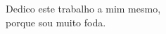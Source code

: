 
\begin{dedicatoria}
	\vspace*{\fill}
	\begin{flushright}
		Dedico este trabalho a mim mesmo, \\
        porque sou muito foda.
	\end{flushright}
\end{dedicatoria}